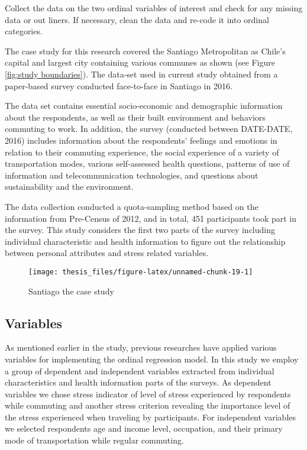 \documentclass[
11pt, %
oneside, %
english, %
singlespacing, %
]{macthesis} %
\begin{document}
Collect the data on the two ordinal variables of interest and check for any missing data or out liners. If necessary, clean the data and re-code it into ordinal categories.

The case study for this research covered the Santiago Metropolitan as Chile's capital and largest city containing various communes as shown (see Figure \ref{fig:study boundaries}). The data-set used in current study obtained from a paper-based survey conducted face-to-face in Santiago in 2016.

The data set contains essential socio-economic and demographic information about the respondents, as well as their built environment and behaviors commuting to work. In addition, the survey (conducted between DATE-DATE, 2016) includes information about the respondents' feelings and emotions in relation to their commuting experience, the social experience of a variety of transportation modes, various self-assessed health questions, patterns of use of information and telecommunication technologies, and questions about sustainability and the environment.

The data collection conducted a quota-sampling method based on the information from Pre-Census of 2012, and in total, 451 participants took part in the survey. This study considers the first two parts of the survey including individual characteristic and health information to figure out the relationship between personal attributes and stress related variables.
\begin{figure}

{\centering \texttt{[image: thesis\_files/figure-latex/unnamed-chunk-19-1]} 

}

\caption{\label{fig:study boundaries}Santiago the case study}\label{fig:unnamed-chunk-19}
\end{figure}
\hypertarget{variables}{%
\subsection{Variables}\label{variables}}

As mentioned earlier in the study, previous researches have applied various variables for implementing the ordinal regression model. In this study we employ a group of dependent and independent variables extracted from individual characteristics and health information parts of the surveys. As dependent variables we chose stress indicator of level of stress experienced by respondents while commuting and another stress criterion revealing the importance level of the stress experienced when traveling by participants. For independent variables we selected respondents age and income level, occupation, and their primary mode of transportation while regular commuting.
\end{document}
